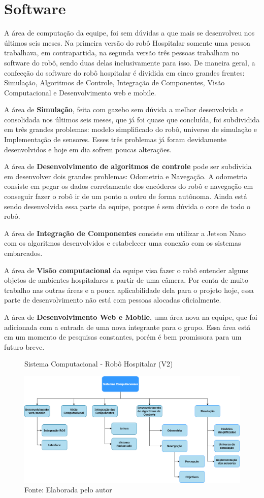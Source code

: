 \documentclass[../poliXuniversity_hospital_-USP-report.tex]{subfiles}
\begin{document}
\section{Software}

A área de computação da equipe, foi sem dúvidas a que mais se desenvolveu nos últimos seis meses. Na primeira versão do robô Hospitalar somente uma pessoa trabalhava, em contrapartida, na segunda versão três pessoas trabalham no software do robô, sendo duas delas inclusivamente para isso. De maneira geral, a confecção do software do robô hospitalar é dividida em cinco grandes frentes: Simulação, Algoritmos de Controle, Integração de Componentes, Visão Computacional e Desenvolvimento web e mobile.

A área de \textbf{Simulação}, feita com gazebo \cite{gazebo21} sem dúvida a melhor desenvolvida e consolidada nos últimos seis meses, que já foi quase que concluída, foi subdividida em três grandes problemas: modelo simplificado do robô, universo de simulação e Implementação de sensores. Esses três problemas já foram devidamente desenvolvidos e hoje em dia sofrem poucas alterações.

A área de \textbf{Desenvolvimento de algoritmos de controle} pode ser subdivida em desenvolver dois grandes problemas: Odometria e Navegação. A odometria consiste em pegar os dados corretamente dos encóderes do robô e navegação em conseguir fazer o robô ir de um ponto a outro de forma autônoma. Ainda está sendo desenvolvida essa parte da equipe, porque é sem dúvida o core de todo o robô.

A área de \textbf{Integração de Componentes} consiste em utilizar a Jetson Nano \cite{jetson21} com os algoritmos desenvolvidos e estabelecer uma conexão com os sistemas embarcados. 

A área de \textbf{Visão computacional} da equipe visa fazer o robô entender alguns objetos de ambientes hospitalares a partir de uma câmera. Por conta de muito trabalho nas outras áreas e a pouca aplicabilidade dela para o projeto hoje, essa parte de desenvolvimento não está com pessoas alocadas oficialmente.

A área de \textbf{Desenvolvimento Web e Mobile}, uma área nova na equipe, que foi adicionada com a entrada de uma nova integrante para o grupo. Essa área está em um momento de pesquisas constantes, porém é bem promissora para um futuro breve.  


\begin{figure}[h]
\centering
    \caption{Sistema Computacional - Robô Hospitalar (V2)}
    \centering %
    \includegraphics[width=17cm]{sistema_computacional.png}
    \caption*{Fonte: Elaborada pelo autor}
    \label{figura:1° Versão Robô Hospitalar}
\end{figure}
\end{document}
